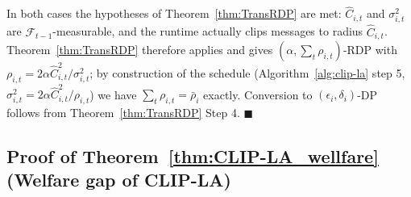 \documentclass{article}
\begin{document}
In both cases the hypotheses of Theorem~\ref{thm:TransRDP} are met: $\hat C_{i,t}$ and $\sigma_{i,t}^2$ are $\mathcal{F}_{t-1}$-measurable, and the runtime actually clips messages to radius $\hat C_{i,t}$. Theorem~\ref{thm:TransRDP} therefore applies and gives $(\alpha, \sum_t \rho_{i,t})$-RDP with $\rho_{i,t} = 2\alpha \hat C_{i,t}^2/\sigma_{i,t}^2$; by construction of the schedule (Algorithm~\ref{alg:clip-la}  step 5, $\sigma_{i,t}^2 = 2\alpha\hat C_{i,t}^2/\rho_{i,t}$) we have $\sum_t \rho_{i,t} = \bar\rho_i$ exactly. Conversion to $(\epsilon_i, \delta_i)$-DP follows from Theorem~\ref{thm:TransRDP} Step 4. $\blacksquare$

\subsection{Proof of Theorem~\ref{thm:CLIP-LA_wellfare} (Welfare gap of CLIP-LA)}\label{app:CLIP-LA_wellfare}
\end{document}
